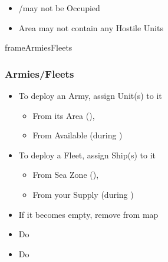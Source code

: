 \documentclass[10pt]{article}
\newlength{\fhArmiesFleets} \setlength\fhArmiesFleets{8\baselineskip}
\begin{document}
\begin{itemize}
	\item \town/\vassal may not be Occupied
	\item Area may not contain any Hostile Units
\end{itemize}

\begin{dynamiccontents*}{frameArmiesFleets}\begin{eubox}{\fhArmiesFleets}
	\subsubsection*{Armies/Fleets }
	\begin{itemize}
		\item To deploy an Army, assign Unit(s) to it 
		\begin{itemize}
			\item From its Area (), 
			\item From Available \manpower (during )
		\end{itemize}
		\item To deploy a Fleet, assign Ship(s) to it
		\begin{itemize}
			\item From Sea Zone (), 
			\item From your Supply (during )
		\end{itemize}
		\item If it becomes empty, remove from map
	\end{itemize}
\end{eubox}\end{dynamiccontents*}

\begin{itemize}
	\item Do   
\end{itemize}

\begin{itemize}
	\item Do   
\end{itemize}
\end{document}
